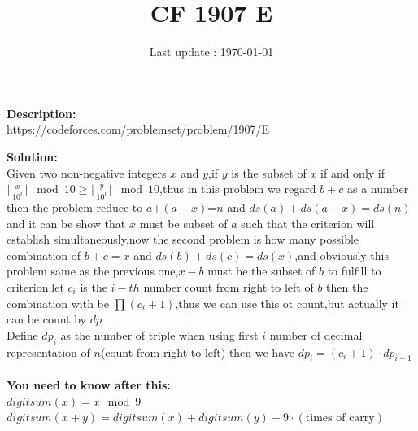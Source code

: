 \documentclass{article}
\begin{document}
\title{\textbf{CF 1907 E}}
\author{}
\date{Last update : \today}

\maketitle

\noindent \textbf{Description:}\\
https://codeforces.com/problemset/problem/1907/E

\noindent \textbf{Solution:}\\
Given two non-negative integers $x$ and $y$,if $y$ is the subset of $x$ if and only if $\lfloor \frac{x}{10^i}\rfloor \mod 10 \ge \lfloor \frac{y}{10^i}\rfloor \mod 10$,thus in this problem we regard $b+c$ as a number then the problem reduce to $a$+$(a-x)$=$n$ and $ds(a)+ds(a-x)=ds(n)$ and it can be show that $x$ must be subset of $a$ such that the criterion will establish simultaneously,now the second problem is how many possible combination of $b+c=x$ and $ds(b)+ds(c)=ds(x)$,and obviously this problem same as the previous one,$x-b$ must be the subset of $b$ to fulfill to criterion,let $c_i$ is the $i-th$ number count from right to left of $b$ then the combination with be $\prod (c_i+1)$,thus we can use this ot count,but actually it can be count by $dp$ \\ 
Define $dp_i$ as the number of triple when using first $i$ number of decimal representation of $n$(count from right to left) then we have $dp_i=(c_i+1)\cdot dp_{i-1}$\\
\\
\noindent \textbf{You need to know after this:}\\
$digitsum(x)=x\mod 9$\\
$digitsum(x+y)=digitsum(x)+digitsum(y)-9\cdot (\text{times of carry})$
\end{document}
